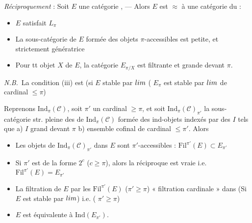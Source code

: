 \documentclass[11pt,a4paper]{article}
\begin{document}
\emph{Réciproquement} : Soit $E$ une \struck{\ill{}} catégorie ,   — Alors $E$ est $\approx$ à une catégorie du
\add{\ill{}} :
\begin{itemize}
  \item[(i)] $E$ satisfait $L_{\pi}$
  \item[(ii)] La sous-catégorie  de $E$ formée des objets
    $\pi$-accessibles est  petite, et strictement
    génératrice
  \item[(iii)] Pour tt objet $X$ de $E$, la catégorie $E_{\pi/X}$ est filtrante
    et grande devant $\pi$.
\end{itemize}
\emph{N.B.}\ La condition (iii) est   (si $E$ stable par  $\varinjlim$ (\ill{} $E_{\pi}$
est stable par $\varinjlim$ de cardinal $\leqslant \pi$)


Reprenons $\mathrm{Ind}_{\pi}(\mathcal{C})$, soit $\pi'$ un cardinal
$\geqslant \pi$, et soit $\mathrm{Ind}_{\pi}(\mathcal{C})_{\pi'}$  la sous-catégorie str. pleine des \ill{} de
$\mathrm{Ind}_{\pi}(\mathcal{C})$ formée des ind-objets indexés par des $I$
tels que a) $I$ grand devant $\pi$ b)   ensemble cofinal de cardinal $\leqslant \pi'$. Alors
\begin{itemize}
  \item[a)] Les objets de $\mathrm{Ind}_{\pi}(\mathcal{C})_{\pi'}$  dans $E$ sont $\pi'$-accessibles  : $\mathrm{Fil}^{\pi'}(E) \subset E_{\pi'}$
  \item[b)] Si $\pi'$ est de la forme $2^{c}$ ($c \geqslant \pi$), alors la
    réciproque est vraie i.e. $\mathrm{Fil}^{\pi'}(E) = E_{\pi'}$
  \item[c)] La filtration de $E$ par les 
    $\mathrm{Fil}^{\pi'}(E)$ ($\pi' \geqslant \pi$) 
    « filtration cardinale » \ill{} dans \ill{} (Si $E$ est stable par
     $\varinjlim$) i.e.   (\ill{} \ill{} $\pi' \geqslant \pi$)
  \item[d)]     $E$ est équivalente à
    $\mathrm{Ind}(E_{\pi'})$. \struck{\ill{}} 
\end{itemize}
\end{document}
